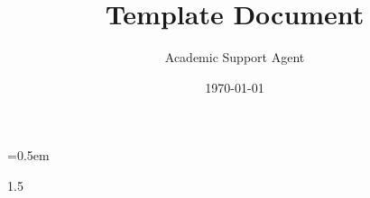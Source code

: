 \documentclass{article}
\title{Template Document}
\author{Academic Support Agent}
\date{\today}
\begin{document}
\maketitle

\font=0.5em%





\renewcommand*\contentsname{\centering Table of Contents}

\newpage




\renewcommand{\listtablename}{\centering List of Tables}


\newpage

\renewcommand{\listfigurename}{\centering List of Figures}

\newpage
















\renewcommand\bibname{References}

\begin{spacing}{1.5}

\end{spacing}
\newpage


\end{document}
